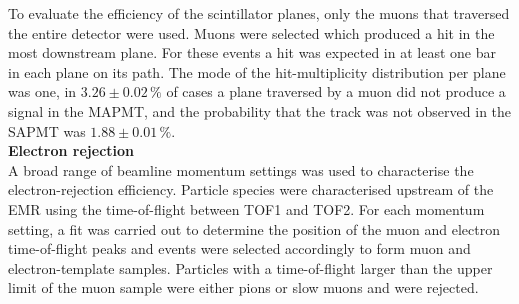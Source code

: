 To evaluate the efficiency of the scintillator planes, only the muons
that traversed the entire detector were used.
Muons were selected which produced a hit in the most downstream plane.
For these events a hit was expected in at least one bar in each plane
on its path.
The mode of the hit-multiplicity distribution per plane was one,
in $3.26\pm0.02\,\%$ of cases a plane traversed by a muon did not
produce a signal in the MAPMT, and the probability that the track was
not observed in the SAPMT was $1.88\pm0.01\,\%$. \\

\noindent\textbf{Electron rejection} \\
\noindent
A broad range of beamline momentum settings was used to characterise
the electron-rejection efficiency.
Particle species were characterised upstream of the EMR using the
time-of-flight between TOF1 and TOF2.
For each momentum setting, a fit was carried out to determine
the position of the muon and electron time-of-flight peaks and events were
selected accordingly to form muon and electron-template samples.
Particles with a time-of-flight larger than the upper limit of the
muon sample were either pions or slow muons and were rejected.

